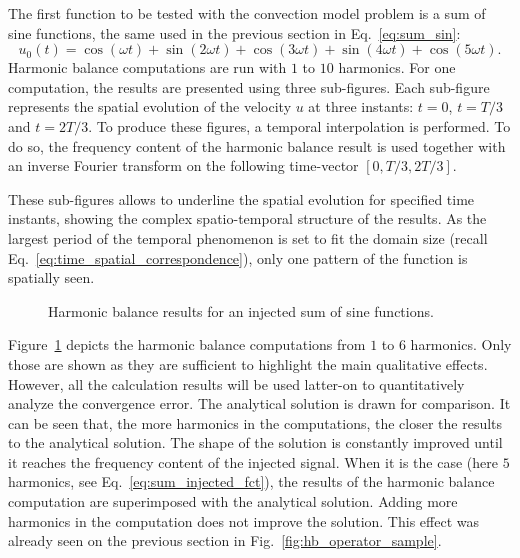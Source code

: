 
The first function to be tested with the convection model problem
is a sum of sine functions, the same used in the previous
section in Eq.~\eqref{eq:sum_sin}:
\begin{equation}
    u_0(t) = \cos(\omega t) + \sin(2 \omega t) +
    \cos(3 \omega t) + \sin(4 \omega t) + \cos(5 \omega t).
    \label{eq:sum_injected_fct}
\end{equation}
Harmonic balance computations are run with $1$ to $10$ harmonics.
For one computation, the results are presented 
using three sub-figures. Each 
sub-figure represents the spatial evolution of the velocity $u$
at three instants: $t=0$, $t=T/3$ and
$t=2T/3$. 
To produce these figures, a temporal interpolation is performed.
To do so, the frequency content of the harmonic balance result is used
together with an inverse Fourier transform on the following time-vector
$[0, T/3, 2T/3]$.

These sub-figures allows to underline
the spatial evolution for specified time instants, showing
the complex spatio-temporal structure of the results. 
As the largest period of
the temporal phenomenon is set to fit the domain size
(recall Eq.~\eqref{eq:time_spatial_correspondence}), only one
pattern of the function is spatially seen.

\begin{figure}[htbp]
  \centering
  \caption{Harmonic balance results for 
  an injected sum of sine functions.}
  \label{fig:inj_sine_results}
\end{figure}

Figure~\ref{fig:inj_sine_results} depicts the harmonic balance
computations from $1$ to $6$ harmonics. Only those are shown
as they are sufficient to highlight the main qualitative effects. However,
all the calculation results will be used latter-on to quantitatively
analyze the convergence error.
The analytical solution is
drawn for comparison. 
It can be seen that, the more harmonics in the
computations, the closer the results to the analytical solution.
The shape of the solution 
is constantly improved until it reaches the frequency content
of the injected signal.
When it is the case
(here $5$ harmonics, see Eq.~\eqref{eq:sum_injected_fct}),
the results of the harmonic balance computation are
superimposed with the analytical solution. Adding
more harmonics in the computation does not improve
the solution. This effect was already seen on the previous section
in Fig.~\ref{fig:hb_operator_sample}.

